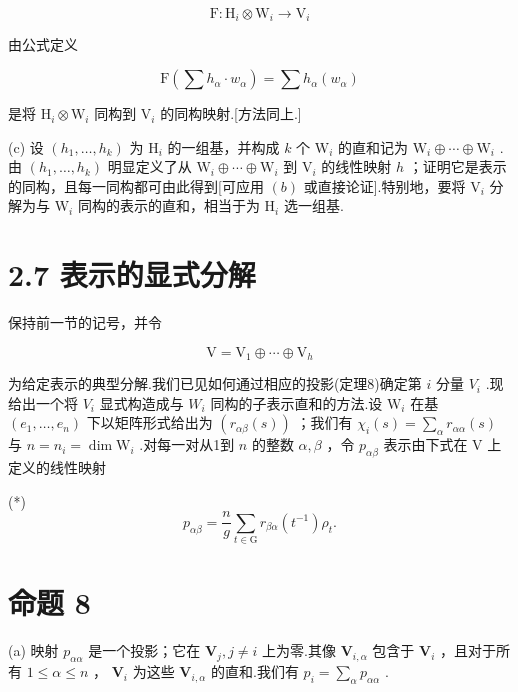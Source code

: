 \[
\mathrm{F} : {\mathrm{H}}_{i} \otimes  {\mathrm{W}}_{i} \rightarrow  {\mathrm{V}}_{i}
\]

由公式定义

\[
\mathrm{F}\left( {\sum {h}_{\alpha } \cdot  {w}_{\alpha }}\right)  = \sum {h}_{\alpha }\left( {w}_{\alpha }\right)
\]

是将 \({\mathrm{H}}_{i} \otimes  {\mathrm{W}}_{i}\) 同构到 \({\mathrm{V}}_{i}\) 的同构映射.[方法同上.]

(c) 设 \(\left( {{h}_{1},\ldots ,{h}_{k}}\right)\) 为 \({\mathrm{H}}_{i}\) 的一组基，并构成 \(k\) 个 \({\mathrm{W}}_{i}\) 的直和记为 \({\mathrm{W}}_{i} \oplus  \cdots  \oplus  {\mathrm{W}}_{i}\) .由 \(\left( {{h}_{1},\ldots ,{h}_{k}}\right)\) 明显定义了从 \({\mathrm{W}}_{i} \oplus  \cdots  \oplus  {\mathrm{W}}_{i}\) 到 \({\mathrm{V}}_{i}\) 的线性映射 \(h\) ；证明它是表示的同构，且每一同构都可由此得到[可应用 \(\left( b\right)\) 或直接论证].特别地，要将 \({\mathrm{V}}_{i}\) 分解为与 \({\mathrm{W}}_{i}\) 同构的表示的直和，相当于为 \({\mathrm{H}}_{i}\) 选一组基.

\section*{2.7 表示的显式分解}

保持前一节的记号，并令

\[
\mathrm{V} = {\mathrm{V}}_{1} \oplus  \cdots  \oplus  {\mathrm{V}}_{h}
\]

为给定表示的典型分解.我们已见如何通过相应的投影(定理8)确定第 \(i\) 分量 \({V}_{i}\) .现给出一个将 \({V}_{i}\) 显式构造成与 \({W}_{i}\) 同构的子表示直和的方法.设 \({\mathrm{W}}_{i}\) 在基 \(\left( {{e}_{1},\ldots ,{e}_{n}}\right)\) 下以矩阵形式给出为 \(\left( {{r}_{\alpha \beta }\left( s\right) }\right)\) ；我们有 \({\chi }_{i}\left( s\right)  = \mathop{\sum }\limits_{\alpha }{r}_{\alpha \alpha }\left( s\right)\) 与 \(n = {n}_{i} = \dim {\mathrm{W}}_{i}\) .对每一对从1到 \(n\) 的整数 \(\alpha ,\beta\) ，令 \({p}_{\alpha \beta }\) 表示由下式在 \(\mathrm{V}\) 上定义的线性映射

(*)
\[
{p}_{\alpha \beta } = \frac{n}{g}\mathop{\sum }\limits_{{t \in  \mathrm{G}}}{r}_{\beta \alpha }\left( {t}^{-1}\right) {\rho }_{t}.
\]

\section*{命题 8}

(a) 映射 \({p}_{\alpha \alpha }\) 是一个投影；它在 \({\mathbf{V}}_{j},j \neq  i\) 上为零.其像 \({\mathbf{V}}_{i,\alpha }\) 包含于 \({\mathbf{V}}_{i}\) ，且对于所有 \(1 \leq  \alpha  \leq  n\) ， \({\mathbf{V}}_{i}\) 为这些 \({\mathbf{V}}_{i,\alpha }\) 的直和.我们有 \({p}_{i} = \mathop{\sum }\limits_{\alpha }{p}_{\alpha \alpha }\) .

